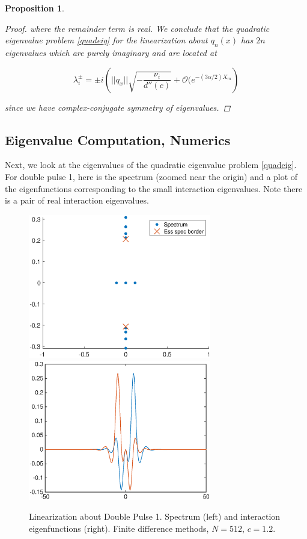 \documentclass[12pt]{article}
\newtheorem{proposition}{Proposition}
\begin{document}
\begin{proposition}
\begin{proof}
where the remainder term is real. We conclude that the quadratic eigenvalue problem \eqref{quadeig} for the linearization about $q_n(x)$ has $2n$ eigenvalues which are purely imaginary and are located at

\begin{equation}
\lambda_i^\pm = \pm i \left( ||q_x|| \sqrt{ -\frac{ \nu_i}{d''(c)} } + \mathcal{O}(e^{-(3 \alpha/2) X_m} \right)
\end{equation}

since we have complex-conjugate symmetry of eigenvalues.

\end{proof}
\end{proposition}


\subsection{Eigenvalue Computation, Numerics}



Next, we look at the eigenvalues of the quadratic eigenvalue problem \eqref{quadeig}. For double pulse 1, here is the spectrum (zoomed near the origin) and a plot of the eigenfunctions corresponding to the small interaction eigenvalues. Note there is a pair of real interaction eigenvalues.

\begin{figure}[H]
\centering
\includegraphics[width=8cm]{spec12_double1.eps}
\includegraphics[width=8cm]{evecs12_double1.eps}
\caption{Linearization about Double Pulse 1. Spectrum (left) and interaction eigenfunctions (right). Finite difference methods, $N = 512$, $c = 1.2$.}
\end{figure}
\end{document}
